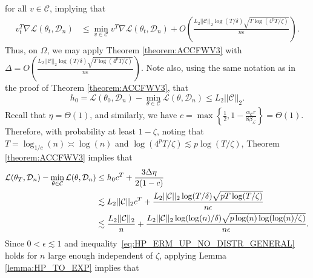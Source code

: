 \documentclass{article}
\begin{document}
for all $v \in \mathcal{C}$, implying that
\begin{align*}
v_t^T\nabla \mathcal{L}(\theta_t, \mathcal{D}_n)
& \le \mathop{\min}\limits_{v \in \mathcal{C}}v^T\nabla \mathcal{L}(\theta_t, \mathcal{D}_n) + O\left(\frac{L_2||\mathcal{C}||_2\log(T/\delta)\sqrt{T\log(4^pT/ \zeta)}}{n \epsilon}\right).
\end{align*}
Thus, on $\Omega$, we may apply Theorem \ref{theorem:ACCFWV3} with $\Delta = O\left(\frac{L_2||\mathcal{C}||_2\log(T/\delta)\sqrt{T \log(4^pT/ \zeta)}}{n \epsilon}\right)$. Note also, using the same notation as in the proof of Theorem \ref{theorem:ACCFWV3}, that
$$h_0 = \mathcal{L}(\theta_0, \mathcal{D}_n) - \mathop{\min}\limits_{\theta \in \mathcal{C}}\mathcal{L}(\theta, \mathcal{D}_n) \leq L_2||\mathcal{C}||_2.$$
Recall that $\eta = \Theta\left(1\right)$, and similarly, we have $c = \max\left\{\frac{1}{2}, 1 - \frac{\alpha_{\mathcal{C}} r}{8\beta_{\mathcal{L}}}\right\} = \Theta\left(1\right)$. Therefore, with probability at least $1 - \zeta$, noting that $T = \log_{1/c}\left(n\right) \asymp \log(n)$ and  $\log(4^pT/\zeta) \lesssim p\log(T/\zeta)$, Theorem \ref{theorem:ACCFWV3} implies that
\begin{align}
\label{eq:HP_ERM_UP_NO_DISTR_GENERAL}
\mathcal{L}(\theta_T, \mathcal{D}_n) - \mathop{\min}\limits_{\theta \in \mathcal{C}}\mathcal{L}(\theta, \mathcal{D}_n) &\leq h_0c^T + \frac{3\Delta\eta}{2(1 - c)} \notag\\ 
&\lesssim L_2||\mathcal{C}||_2c^T + \frac{L_2||\mathcal{C}||_2\log(T/\delta)\sqrt{pT\log(T/ \zeta)}}{n \epsilon} \notag\\
&\lesssim \frac{L_2||\mathcal{C}||_2}{n} + \frac{L_2||\mathcal{C}||_2\log(\log(n)/\delta)\sqrt{p\log(n)\log(\log(n)/\zeta)}}{n\epsilon}.
\end{align}
Since $0 < \epsilon \lesssim 1$ and inequality~\eqref{eq:HP_ERM_UP_NO_DISTR_GENERAL} holds for $n$ large enough independent of $\zeta$, applying Lemma \ref{lemma:HP_TO_EXP} implies that
\end{document}
